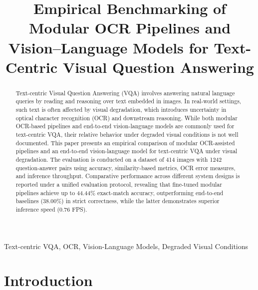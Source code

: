 \documentclass[conference]{IEEEtran}
\begin{document}
\title{Empirical Benchmarking of Modular OCR Pipelines and Vision--Language Models for Text-Centric Visual Question Answering}

\maketitle


\begin{abstract} 
Text-centric Visual Question Answering (VQA) involves answering natural language queries by reading and reasoning over text embedded in images. In real-world settings, such text is often affected by visual degradation, which introduces uncertainty in optical character recognition (OCR) and downstream reasoning. While both modular OCR-based pipelines and end-to-end vision-language models are commonly used for text-centric VQA, their relative behavior under degraded visual conditions is not well documented. This paper presents an empirical comparison of modular OCR-assisted pipelines and an end-to-end vision-language model for text-centric VQA under visual degradation. The evaluation is conducted on a dataset of 414 images with 1242 question-answer pairs using accuracy, similarity-based metrics, OCR error measures, and inference throughput. Comparative performance across different system designs is reported under a unified evaluation protocol, revealing that fine-tuned modular pipelines achieve up to 44.44\% exact-match accuracy, outperforming end-to-end baselines (38.00\%) in strict correctness, while the latter demonstrates superior inference speed (0.76 FPS).
\end{abstract}

\begin{IEEEkeywords}
Text-centric VQA, OCR, Vision-Language Models, Degraded Visual Conditions
\end{IEEEkeywords}


\section{Introduction}
\end{document}
